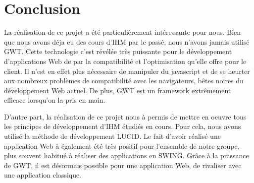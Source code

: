 \chapter{Conclusion}
La réalisation de ce  projet a été particulièrement intéressante pour nous. Bien que nous avons déja eu des cours d'IHM par le passé, nous n'avons jamais utilisé GWT. Cette technologie c'est révélée très puissante pour le développement d'applications Web de par la compatibilité et l'optimisation qu'elle offre pour le client. Il n'est en effet plus nécessaire de manipuler du javascript et de se heurter aux nombreux problèmes de compatibilité avec les navigateurs, bêtes noires du développement Web actuel. De plus, GWT est un framework extrêmement efficace lorsqu'on la pris en main.
\medskip

D'autre part, la réalisation de ce projet nous à permis de mettre en oeuvre tous les principes de développement d'IHM étudiés en cours. Pour cela, nous avons utilisé la méthode de développement LUCID. Le fait d'avoir réalisé une application Web à également été très positif pour l'ensemble de notre groupe, plus souvent habitué à réaliser des applications en SWING. Grâce à la puissance de GWT, il est désormais possible pour une application Web, de rivaliser avec une application classique.

























